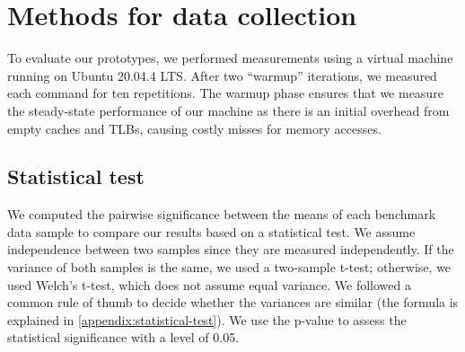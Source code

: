 
\section{Methods for data collection}\label{methods-for-data-collection}
To evaluate our prototypes, we performed measurements using a virtual machine running on Ubuntu 20.04.4 LTS. After two ``warmup'' iterations, we measured each command for ten repetitions. The warmup phase ensures that we measure the steady-state performance of our machine as there is an initial overhead from empty caches and TLBs, causing costly misses for memory accesses.

\subsection{Statistical test}
We computed the pairwise significance between the means of each benchmark data sample to compare our results based on a statistical test. We assume independence between two samples since they are measured independently. If the variance of both samples is the same, we used a two-sample t-test; otherwise, we used Welch’s t-test, which does not assume equal variance. We followed a common rule of thumb to decide whether the variances are similar (the formula is explained in \ref{appendix:statistical-test}). We use the p-value to assess the statistical significance with a level of 0.05.
